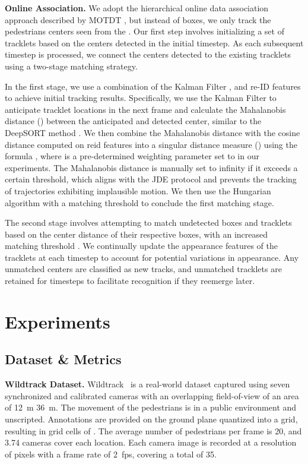 \documentclass[10pt,twocolumn,letterpaper]{article}
\newcommand{\nparagraph}[1]{\noindent\textbf{#1.  }}
\begin{document}
{\nparagraph{Online Association}
We adopt the hierarchical online data association approach described by MOTDT \cite{chen2018real}, but instead of boxes, we only track the pedestrians centers seen from the \textit{}. Our first step involves initializing a set of tracklets based on the centers detected in the initial timestep. As each subsequent timestep is processed, we connect the centers detected to the existing tracklets using a two-stage matching strategy.

In the first stage, we use a combination of the Kalman Filter \cite{kalman1960new}, and re-ID features to achieve initial tracking results. Specifically, we use the Kalman Filter to anticipate tracklet locations in the next frame and calculate the Mahalanobis distance () between the anticipated and detected center, similar to the DeepSORT method \cite{Wojke2017simple}. We then combine the Mahalanobis distance with the cosine distance computed on \gls{reid} features into a singular distance measure () using the formula , where  is a pre-determined weighting parameter set to  in our experiments. The Mahalanobis distance is manually set to infinity if it exceeds a certain threshold, which aligns with the JDE protocol \cite{wang2020towards} and prevents the tracking of trajectories exhibiting implausible motion. We then use the Hungarian algorithm with a matching threshold  to conclude the first matching stage.

The second stage involves attempting to match undetected boxes and tracklets based on the center distance of their respective boxes, with an increased matching threshold . We continually update the appearance features of the tracklets at each timestep to account for potential variations in appearance. Any unmatched centers are classified as new tracks, and unmatched tracklets are retained for  timesteps to facilitate recognition if they reemerge later.
 \section{Experiments}\label{sec:experiments}

\subsection{Dataset \& Metrics}

\nparagraph{Wildtrack Dataset} Wildtrack~\cite{chavdarova2018wildtrack} is a real-world dataset captured using seven synchronized and calibrated cameras with an overlapping field-of-view of an area of \qty{12}{\metre}  \qty{36}{\metre}. The movement of the pedestrians is in a public environment and unscripted. Annotations are provided on the ground plane quantized into a  grid, resulting in grid cells of .
The average number of pedestrians per frame is 20, and 3.74 cameras cover each location. Each camera image is recorded at a resolution of  pixels with a frame rate of \qty{2}{fps}, covering a total of \qty{35}{\min}.

}
\end{document}
